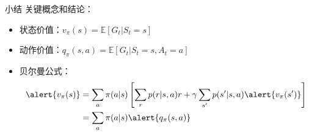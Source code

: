 \begin{frame}{小结}
    关键概念和结论：
    \begin{itemize}
        \item 状态价值：$v_\pi(s)=\mathbb{E}[G_t|S_t=s]$
        \item 动作价值：$q_\pi(s,a)=\mathbb{E}[G_t|S_t=s,A_t=a]$
        \item 贝尔曼公式：
        \[
            \begin{aligned}
                \alert{v_\pi(s)}&=\sum_a\pi(a|s)\left[\sum_r p(r|s,a)r+\gamma\sum_{s'}p(s'|s,a)\alert{v_{\pi}(s')}\right] \\
                &=\sum_a\pi(a|s)\alert{q_\pi(s,a)}
            \end{aligned}
        \]
    \end{itemize}
\end{frame}
